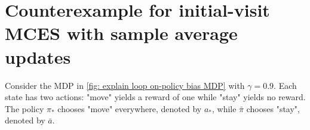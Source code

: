 \documentclass{article}
\begin{document}
\section{Counterexample for initial-visit MCES with sample average updates}
\label{sec: counterexample iv mces}


\label{sec: 3 state sampling strat}
Consider the MDP in \autoref{fig: explain loop on-policy bias MDP} with $\gamma = 0.9$.
Each state has two actions: "move" yields a reward of one while "stay" yields no reward. The policy $\pi_*$ chooses "move" everywhere, denoted by $a_*$, while $\bar \pi$ chooses "stay", denoted by $\bar a$.

% 



% 
\end{document}

